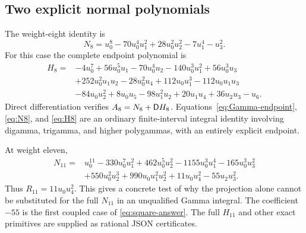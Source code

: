 \subsection{Two explicit normal polynomials}
The weight-eight identity is
\begin{equation}\label{eq:N8}
 N_8=u_0^8-70u_0^4u_1^2+28u_0^2u_2^2-7u_1^4-u_3^2.
\end{equation}
For this case the complete endpoint polynomial is
\begin{equation}\label{eq:H8}
\begin{split}
 H_8={}&-4u_0^7+56u_0^5u_1-70u_0^4u_2-140u_0^3u_1^2
       +56u_0^3u_3\\
 &+252u_0^2u_1u_2-28u_0^2u_4+112u_0u_1^3
       -112u_0u_1u_3\\
 &-84u_0u_2^2+8u_0u_5-98u_1^2u_2+20u_1u_4+36u_2u_3-u_6.
\end{split}
\end{equation}
Direct differentiation verifies $A_8=N_8+\mathsf D H_8$.
Equations~\eqref{eq:Gamma-endpoint}, \eqref{eq:N8}, and \eqref{eq:H8}
are an ordinary finite-interval integral identity involving digamma,
trigamma, and higher polygammas, with an entirely explicit endpoint.

At weight eleven,
\begin{equation}\label{eq:N11}
\begin{split}
 N_{11}={}&u_0^{11}-330u_0^7u_1^2+462u_0^5u_2^2
 -1155u_0^3u_1^4-165u_0^3u_3^2\\
 &+550u_0^2u_2^3+990u_0u_1^2u_2^2+11u_0u_4^2-55u_2u_3^2.
\end{split}
\end{equation}
Thus $R_{11}=11u_0u_4^2$. This gives a concrete test of why the
projection alone cannot be substituted for the full $N_{11}$ in an
unqualified Gamma integral. The coefficient $-55$ is the first coupled
case of \eqref{eq:square-answer}. The full $H_{11}$ and other exact
primitives are supplied as rational JSON certificates.

